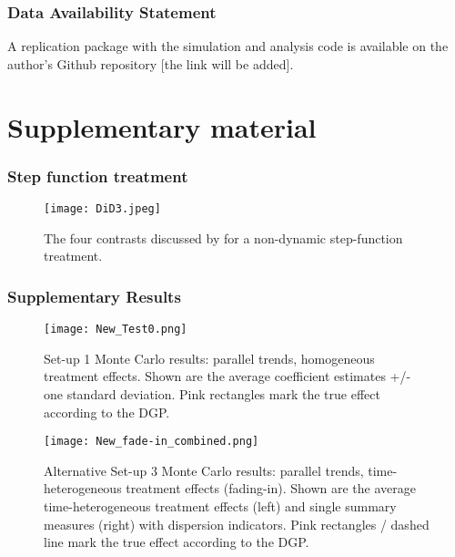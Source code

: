 \clearpage

\printbibliography

\section*{Data Availability Statement}

A replication package with the simulation and analysis code is available on the author's Github repository [the link will be added].


\clearpage
\appendix

\setcounter{table}{0}
\renewcommand{\thetable}{S\arabic{table}}\setcounter{figure}{0}
\renewcommand{\thefigure}{S\arabic{figure}}

\part*{\center Supplementary material} 

\section{Step function treatment} \label{suppl:step}

\begin{figure}[h!]
  \centering
  \texttt{[image: DiD3.jpeg]}
  \caption{The four contrasts discussed by \textcite{Goodman-Bacon.2021} for a non-dynamic step-function treatment.}
  \label{fig:step}
\end{figure}

\clearpage

\section{Supplementary Results} \label{suppl:desc}

\begin{figure}[h!]    \centering
    \texttt{[image: New\_Test0.png]} 
    \caption{Set-up 1 Monte Carlo results: parallel trends, homogeneous treatment effects. Shown are the average coefficient estimates +/- one standard deviation. Pink rectangles mark the true effect according to the DGP.}    \label{fig:fig1}    \hypertarget{fig:fig1}{}\end{figure}


\begin{figure}[h!]    \texttt{[image: New\_fade-in\_combined.png]} 
    \caption{Alternative Set-up 3 Monte Carlo results: parallel trends, time-heterogeneous treatment effects (fading-in). Shown are the average time-heterogeneous treatment effects (left) and single summary measures (right) with dispersion indicators. Pink rectangles / dashed line mark the true effect according to the DGP.}    \label{fig:fade-in}\end{figure}

